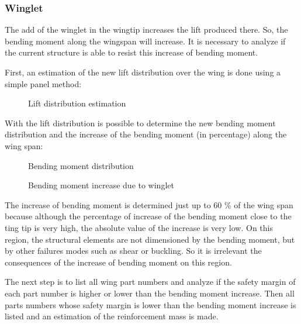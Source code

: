 \subsubsection{Winglet}

The add of the winglet in the wingtip increases the lift produced there. So, the bending moment along the wingspan will increase. It is necessary to analyze if the current structure is able to resist this increase of bending moment.

First, an estimation of the new lift distribution over the wing is done using a simple panel method:

\begin{figure}[H] %
\caption{Lift distribution estimation}
\label{fig:fig1_Lift_distribution_estimation}
\end{figure}

With the lift distribution is possible to determine the new bending moment distribution and the increase of the bending moment (in percentage) along the wing span:

\begin{figure}[H] %
\caption{Bending moment distribution}
\label{fig:fig2_Bending_moment_distribution}
\end{figure}

\begin{figure}[H] %
\caption{Bending moment increase due to winglet}
\label{fig:fig3_Bending_moment_increase_winglet}
\end{figure}

The increase of bending moment is determined just up to 60 \% of the wing span because although the percentage of increase of the bending moment close to the ting tip is very high, the absolute value of the increase is very low. On this region, the structural elements are not dimensioned by the bending moment, but by other failures modes such as shear or buckling. So it is irrelevant the consequences of the increase of bending moment on this region.

The next step is to list all wing part numbers and analyze if the safety margin of each part number is higher or lower than the bending moment increase. Then all parts numbers whose safety margin is lower than the bending moment increase is listed and an estimation of the reinforcement mass is made.

